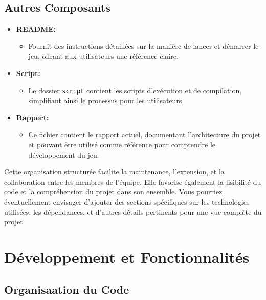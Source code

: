 \documentclass{article}
\begin{document}
\subsection*{Autres Composants}

\begin{itemize}
    \item \textbf{README:}
    \begin{itemize}
        \item Fournit des instructions détaillées sur la manière de lancer et démarrer le jeu, offrant aux utilisateurs une référence claire.
    \end{itemize}

    \item \textbf{Script:}
    \begin{itemize}
        \item Le dossier \texttt{script} contient les scripts d'exécution et de compilation, simplifiant ainsi le processus pour les utilisateurs.
    \end{itemize}

    \item \textbf{Rapport:}
    \begin{itemize}
        \item Ce fichier contient le rapport actuel, documentant l'architecture du projet et pouvant être utilisé comme référence pour comprendre le développement du jeu. \\
    \end{itemize}
\end{itemize}

Cette organisation structurée facilite la maintenance, l'extension, et la collaboration entre les membres de l'équipe. Elle favorise également la lisibilité du code et la compréhension du projet dans son ensemble. Vous pourriez éventuellement envisager d'ajouter des sections spécifiques sur les technologies utilisées, les dépendances, et d'autres détails pertinents pour une vue complète du projet.



\section{Développement et Fonctionnalités}

\subsection{Organisaation du Code}
\end{document}
